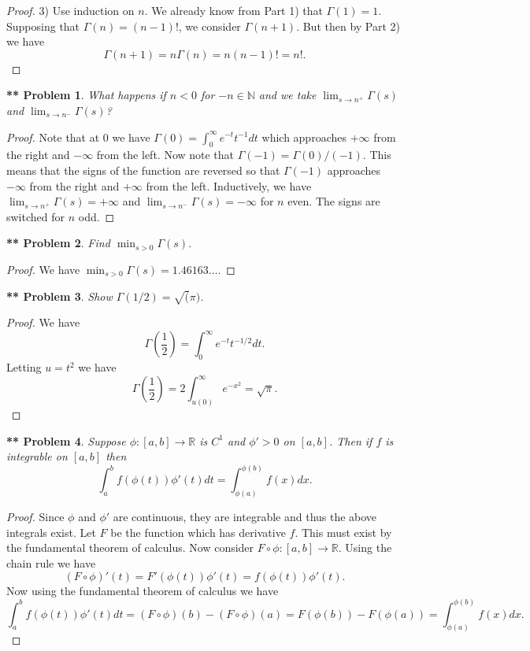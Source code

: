 \documentclass{article}
\newtheorem{**}{** Problem}
\begin{document}
\begin{flushleft}
\begin{proof}
3) Use induction on $n$. We already know from Part 1) that $\Gamma(1) = 1$. Supposing that $\Gamma(n) = (n-1)!$, we consider $\Gamma(n+1)$. But then by Part 2) we have
\[
\Gamma(n+1) = n \Gamma(n) = n(n-1)! = n!.
\]
\end{proof}

\begin{**}
What happens if $n < 0$ for $-n \in \mathbb{N}$ and we take $\lim_{s \rightarrow n^+} \Gamma(s)$ and $\lim_{s \rightarrow n^-} \Gamma(s)$?
\end{**}
\begin{proof}
Note that at $0$ we have $\Gamma(0) = \int_0^{\infty} e^{-t} t^{-1} dt$ which approaches $+\infty$ from the right and $-\infty$ from the left. Now note that $\Gamma(-1) = \Gamma(0)/(-1)$. This means that the signs of the function are reversed so that $\Gamma(-1)$ approaches $-\infty$ from the right and $+\infty$ from the left. Inductively, we have $\lim_{s \rightarrow n^+} \Gamma(s) = +\infty$ and $\lim_{s \rightarrow n^-} \Gamma(s) = -\infty$ for $n$ even. The signs are switched for $n$ odd.
\end{proof}

\begin{**}
Find $\min_{s > 0} \Gamma(s)$.
\end{**}
\begin{proof}
We have $\min_{s > 0} \Gamma(s) = 1.46163\dots$.
\end{proof}

\begin{**}
Show $\Gamma(1/2) = \sqrt(\pi)$.
\end{**}
\begin{proof}
We have
\[
\Gamma \left ( \frac{1}{2} \right ) = \int_0^{\infty} e^{-t} t^{-1/2} dt.
\]
Letting $u = t^2$ we have
\[
\Gamma \left ( \frac{1}{2} \right ) = 2 \int_{u(0)}^{\infty} e^{-x^2} = \sqrt{\pi}.
\]
\end{proof}

\begin{**}
Suppose $\phi : [a,b] \rightarrow \mathbb{R}$ is $C^1$ and $\phi' > 0$ on $[a,b]$. Then if $f$ is integrable on $[a,b]$ then
\[
\int_a^b f(\phi(t)) \phi'(t) dt = \int_{\phi(a)}^{\phi(b)} f(x) dx.
\]
\end{**}
\begin{proof}
Since $\phi$ and $\phi'$ are continuous, they are integrable and thus the above integrals exist. Let $F$ be the function which has derivative $f$. This must exist by the fundamental theorem of calculus. Now consider $F \circ \phi : [a,b] \rightarrow \mathbb{R}$. Using the chain rule we have
\[
(F \circ \phi)'(t) = F'(\phi(t))\phi'(t) = f(\phi(t))\phi'(t).
\]
Now using the fundamental theorem of calculus we have
\[
\int_a^b f(\phi(t))\phi'(t)dt = (F \circ \phi)(b) - (F \circ \phi)(a) = F(\phi(b)) - F(\phi(a)) = \int_{\phi(a)}^{\phi(b)} f(x) dx.
\]
\end{proof}

\end{flushleft}
\end{document}
